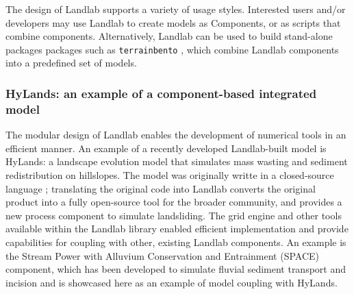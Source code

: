 \documentclass[journal abbreviation, manuscript]{copernicus}
\begin{document}
The design of Landlab supports a variety of usage styles. Interested users and/or developers may use Landlab to create models as Components, or as scripts that combine components. Alternatively, Landlab can be used to build stand-alone packages packages such as \texttt{terrainbento} \citep{barnhart2019terrainbento}, which combine Landlab components into a predefined set of models.




\subsubsection{HyLands: an example of a component-based integrated model}
  
The modular design of Landlab enables the development of numerical tools in an efficient manner. An example of a recently developed Landlab-built model is HyLands: a landscape evolution model that simulates mass wasting and sediment redistribution on hillslopes. The model was originally writte in a closed-source language \citep{campforts2020hylands}; translating the original code into Landlab converts the original product into a fully  open-source tool for the broader community, and provides a new process component to simulate landsliding. The grid engine and other tools available within the Landlab library enabled efficient implementation and provide capabilities for coupling with other, existing Landlab components. An example is the Stream Power with Alluvium Conservation and Entrainment (SPACE) component, which has been developed to simulate fluvial sediment transport and incision \citep{shobe2017space} and is showcased here as an example of model coupling with HyLands. 
\end{document}
